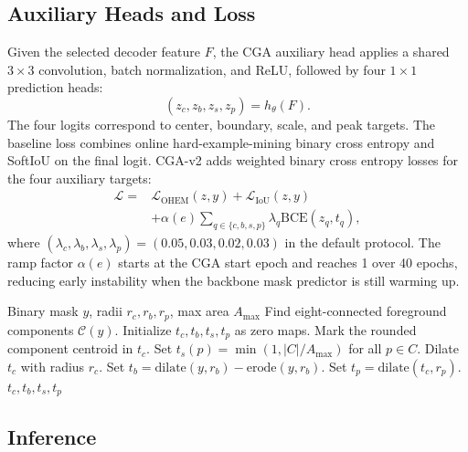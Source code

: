 \documentclass[letterpaper]{article}
\begin{document}
\subsection{Auxiliary Heads and Loss}

Given the selected decoder feature $F$, the CGA auxiliary head applies a shared $3 \times 3$ convolution, batch normalization, and ReLU, followed by four $1 \times 1$ prediction heads:
\begin{equation}
(z_c, z_b, z_s, z_p) = h_{\theta}(F).
\end{equation}
The four logits correspond to center, boundary, scale, and peak targets. The baseline loss combines online hard-example-mining binary cross entropy and SoftIoU on the final logit. CGA-v2 adds weighted binary cross entropy losses for the four auxiliary targets:
\begin{equation}
\begin{aligned}
\mathcal{L} ={}& \mathcal{L}_{\mathrm{OHEM}}(z,y)
 + \mathcal{L}_{\mathrm{IoU}}(z,y) \\
& + \alpha(e) \sum_{q \in \{c,b,s,p\}}
 \lambda_q \mathrm{BCE}(z_q,t_q),
\end{aligned}
\end{equation}
where $(\lambda_c,\lambda_b,\lambda_s,\lambda_p)=(0.05,0.03,0.02,0.03)$ in the default protocol. The ramp factor $\alpha(e)$ starts at the CGA start epoch and reaches 1 over 40 epochs, reducing early instability when the backbone mask predictor is still warming up.

\begin{algorithm}[t]
\caption{Training-time CGA-v2 target construction}
\label{alg:cga}
\begin{algorithmic}[1]
\REQUIRE Binary mask $y$, radii $r_c,r_b,r_p$, max area $A_{\max}$
\STATE Find eight-connected foreground components $\mathcal{C}(y)$.
\STATE Initialize $t_c,t_b,t_s,t_p$ as zero maps.
  \STATE Mark the rounded component centroid in $t_c$.
  \STATE Set $t_s(p)=\min(1, |C|/A_{\max})$ for all $p \in C$.
\ENDFOR
\STATE Dilate $t_c$ with radius $r_c$.
\STATE Set $t_b=\mathrm{dilate}(y,r_b)-\mathrm{erode}(y,r_b)$.
\STATE Set $t_p=\mathrm{dilate}(t_c,r_p)$.
\RETURN $t_c,t_b,t_s,t_p$
\end{algorithmic}
\end{algorithm}

\subsection{Inference}
\end{document}

